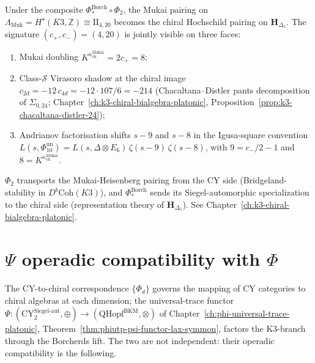 \begin{remark}
\label{rem:cy2ch-mukai-4-20-signature}
Under the composite $\Phi^{\mathrm{Borch}}_*\circ\Phi_2$, the Mukai pairing on
$\Lambda_{\mathrm{Muk}} = H^\star(K3,\mathbb Z) \cong \mathrm{II}_{4,20}$
becomes the chiral Hochschild pairing on $\mathbf H_{\Delta_5}$. The
signature $(c_+, c_-) = (4, 20)$ is jointly visible on three faces:
\begin{enumerate}
\item Mukai doubling $K^{\kappa_{\mathrm{ch}}^{\mathrm{Mukai}}} = 2c_+ = 8$;
\item Class-$\mathcal S$ Virasoro shadow at the chiral image
 $c_{2d} = -12\,c_{4d} = -12\cdot 107/6 = -214$
 (Chacaltana--Distler pants decomposition of $\Sigma_{0,24}$;
 Chapter~\ref{ch:k3-chiral-bialgebra-platonic},
 Proposition~\ref{prop:k3-chacaltana-distler-24});
\item Andrianov factorisation shifts $s-9$ and $s-8$ in the
 Igusa-square convention
 $L(s,\Phi_{10}^{\mathrm{un}}) = L(s,\Delta\otimes E_6)\,\zeta(s-9)\,\zeta(s-8)$,
 with $9 = c_-/2 - 1$ and $8 = K^{\kappa_{\mathrm{ch}}^{\mathrm{Mukai}}}$.
\end{enumerate}
$\Phi_2$ transports the Mukai-Heisenberg pairing from the CY side
(Bridgeland-stability in $D^b\mathrm{Coh}(K3)$), and
$\Phi^{\mathrm{Borch}}_*$ sends its Siegel-automorphic specialization to
the chiral side (representation theory of $\mathbf H_{\Delta_5}$). See
Chapter~\ref{ch:k3-chiral-bialgebra-platonic}.
\end{remark}

\section{\texorpdfstring{$\Psi$}{Psi} operadic compatibility with \texorpdfstring{$\Phi$}{Phi}}
\label{sec:cy2ch-psi-operadic-compatibility}

The CY-to-chiral correspondence $\{\Phi_d\}$ governs the
mapping of CY categories to chiral algebras at each dimension; the
universal-trace functor
$\Psi: (\mathrm{CY}^{\mathrm{Siegel\text{-}aut}}_2, \oplus) \to
(\mathrm{QHopf}^{\mathrm{BKM}}, \otimes)$ of
Chapter~\ref{ch:phi-universal-trace-platonic},
Theorem~\ref{thm:phiutp-psi-functor-lax-symmon}, factors the K3-branch
through the Borcherds lift. The two are not independent: their
operadic compatibility is the following.

